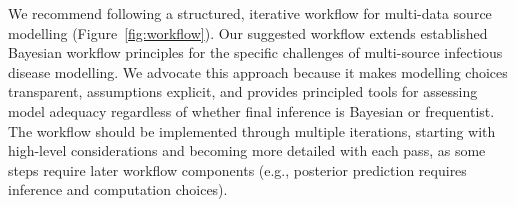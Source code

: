 \documentclass{article}
\begin{document}


We recommend following a structured, iterative workflow for multi-data source modelling (Figure~\ref{fig:workflow}). Our suggested workflow extends established Bayesian workflow principles \citep{gelman2020bayesian} for  the specific challenges of multi-source infectious disease modelling.
We advocate this approach because it makes modelling choices transparent, assumptions explicit, and provides principled tools for assessing model adequacy regardless of whether final inference is Bayesian or frequentist.
The workflow should be implemented through multiple iterations, starting with high-level considerations and becoming more detailed with each pass, as some steps require later workflow components (e.g., posterior prediction requires inference and computation choices).
\end{document}
